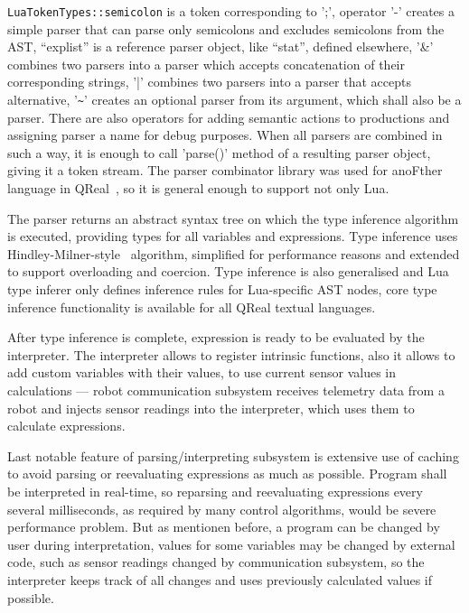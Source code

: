 \documentclass[conference]{IEEEtran}
\begin{document}
\verb|LuaTokenTypes::semicolon| is a token corresponding to ';', operator '-' creates a simple parser that can parse only semicolons and excludes semicolons from the AST, ``explist'' is a reference parser object, like ``stat'', defined elsewhere, '\&' combines two parsers into a parser which accepts concatenation of their corresponding strings, '|' combines two parsers into a parser that accepts alternative, '\verb|~|' creates an optional parser from its argument, which shall also be a parser. There are also operators for adding semantic actions to productions and assigning parser a name for debug purposes. When all parsers are combined in such a way, it is enough to call 'parse()' method of a resulting parser object, giving it a token stream. The parser combinator library was used for anoFther language in QReal~\cite{tikhonova2015generation}, so it is general enough to support not only Lua.

The parser returns an abstract syntax tree on which the type inference algorithm is executed, providing types for all variables and expressions. Type inference uses Hindley-Milner-style~\cite{damas1982principal} algorithm, simplified for performance reasons and extended to support overloading and coercion. Type inference is also generalised and Lua type inferer only defines inference rules for Lua-specific AST nodes, core type inference functionality is available for all QReal textual languages.

After type inference is complete, expression is ready to be evaluated by the interpreter. The interpreter allows to register intrinsic functions, also it allows to add custom variables with their values, to use current sensor values in calculations --- robot communication subsystem receives telemetry data from a robot and injects sensor readings into the interpreter, which uses them to calculate expressions.

Last notable feature of parsing/interpreting subsystem is extensive use of caching to avoid parsing or reevaluating expressions as much as possible. Program shall be interpreted in real-time, so reparsing and reevaluating expressions every several milliseconds, as required by many control algorithms, would be severe performance problem. But as mentionen before, a program can be changed by user during interpretation, values for some variables may be changed by external code, such as sensor readings changed by communication subsystem, so the interpreter keeps track of all changes and uses previously calculated values if possible.
\end{document}
